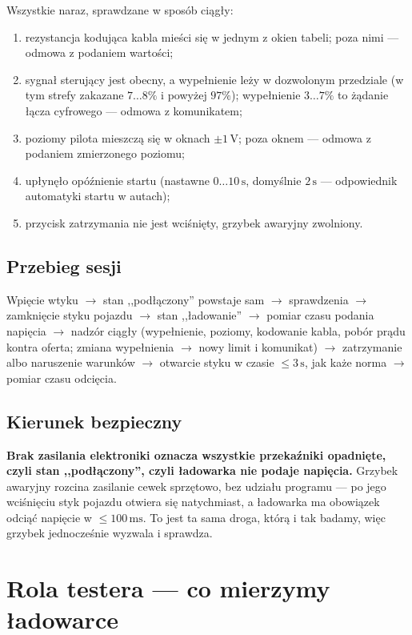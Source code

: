 \documentclass[a4paper,11pt]{article}
\newcommand{\volt}{\,\mathrm{V}}
\newcommand{\ms}{\,\mathrm{ms}}
\newcommand{\sek}{\,\mathrm{s}}
\begin{document}
Wszystkie naraz, sprawdzane w sposób ciągły:

\begin{enumerate}
\item rezystancja kodująca kabla mieści się w jednym z okien tabeli; poza nimi ---
      odmowa z podaniem wartości;
\item sygnał sterujący jest obecny, a wypełnienie leży w dozwolonym przedziale
      (w tym strefy zakazane $7\ldots8\%$ i powyżej $97\%$); wypełnienie
      $3\ldots7\%$ to żądanie łącza cyfrowego --- odmowa z komunikatem;
\item poziomy pilota mieszczą się w oknach $\pm1\volt$; poza oknem --- odmowa
      z podaniem zmierzonego poziomu;
\item upłynęło opóźnienie startu (nastawne $0\ldots10\sek$, domyślnie $2\sek$ ---
      odpowiednik automatyki startu w autach);
\item przycisk zatrzymania nie jest wciśnięty, grzybek awaryjny zwolniony.
\end{enumerate}

\subsection{Przebieg sesji}

Wpięcie wtyku $\rightarrow$ stan ,,podłączony'' powstaje sam $\rightarrow$
sprawdzenia $\rightarrow$ zamknięcie styku pojazdu $\rightarrow$ stan ,,ładowanie''
$\rightarrow$ pomiar czasu podania napięcia $\rightarrow$ nadzór ciągły
(wypełnienie, poziomy, kodowanie kabla, pobór prądu kontra oferta; zmiana
wypełnienia $\rightarrow$ nowy limit i komunikat) $\rightarrow$ zatrzymanie albo
naruszenie warunków $\rightarrow$ otwarcie styku w czasie $\le 3\sek$, jak każe
norma $\rightarrow$ pomiar czasu odcięcia.

\subsection{Kierunek bezpieczny}

\textbf{Brak zasilania elektroniki oznacza wszystkie przekaźniki opadnięte, czyli
stan ,,podłączony'', czyli ładowarka nie podaje napięcia.} Grzybek awaryjny
rozcina zasilanie cewek sprzętowo, bez udziału programu --- po jego wciśnięciu
styk pojazdu otwiera się natychmiast, a ładowarka ma obowiązek odciąć napięcie
w $\le100\ms$. To jest ta sama droga, którą i tak badamy, więc grzybek jednocześnie
wyzwala i sprawdza.

\section{Rola testera --- co mierzymy ładowarce}
\label{sec:tester}
\end{document}
